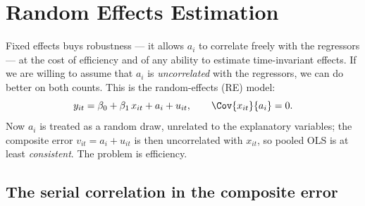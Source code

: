 
\section{Random Effects Estimation}
\label{sec:re}

Fixed effects buys robustness --- it allows $a_i$ to correlate freely with the regressors --- at the cost of efficiency and of any ability to estimate time-invariant effects. If we are willing to assume that $a_i$ is \emph{uncorrelated} with the regressors, we can do better on both counts. This is the random-effects (RE) model:
\[
y_{it} = \beta_0 + \beta_1\, x_{it} + a_i + u_{it},
\qquad \Cov{x_{it}}{a_i} = 0.
\]
Now $a_i$ is treated as a random draw, unrelated to the explanatory variables; the composite error $v_{it}=a_i+u_{it}$ is then uncorrelated with $x_{it}$, so pooled OLS is at least \emph{consistent}. The problem is efficiency.

\subsection{The serial correlation in the composite error}

